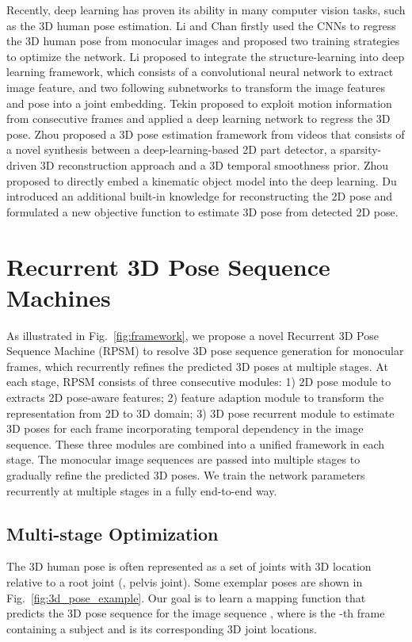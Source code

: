 \documentclass[10pt,twocolumn,letterpaper]{article}
\begin{document}
Recently, deep learning has proven its ability in many computer vision tasks, such as the 3D human pose estimation. Li and Chan \cite{li20143d} firstly used the CNNs to regress the 3D human pose from monocular images and proposed two training strategies to optimize the network. Li \etal \cite{li2015maximum} proposed to integrate the structure-learning into deep learning framework, which consists of a convolutional neural network to extract image feature, and two following subnetworks to transform the image features and pose into a joint embedding. Tekin \etal \cite{Tekin_2016_CVPR} proposed to exploit motion information from consecutive frames and applied a deep learning network to regress the 3D pose. Zhou \etal \cite{zhou2015sparseness} proposed a 3D pose estimation framework from videos that consists of a novel synthesis between a deep-learning-based 2D part detector, a sparsity-driven 3D reconstruction approach and a 3D temporal smoothness prior. Zhou \etal \cite{zhou2016deep} proposed to directly embed a kinematic object model into the deep learning. Du \etal \cite{DBLP:conf/eccv/DuWLHGWKG16} introduced an additional built-in knowledge for reconstructing the 2D pose and formulated a new objective function to estimate 3D pose from detected 2D pose.



\section{Recurrent 3D Pose Sequence Machines}
As illustrated in Fig.~\ref{fig:framework}, we propose a novel Recurrent 3D Pose Sequence Machine (RPSM) to resolve 3D pose sequence generation for monocular frames, which recurrently refines the predicted 3D poses at multiple stages. At each stage, RPSM consists of three consecutive modules: 1) 2D pose module to extracts 2D pose-aware features; 2) feature adaption module to transform the representation from 2D to 3D domain; 3) 3D pose recurrent module to estimate 3D poses for each frame incorporating temporal dependency in the image sequence. These three modules are combined into a unified framework in each stage. The monocular image sequences are passed into multiple stages to gradually refine the predicted 3D poses. We train the network parameters recurrently at multiple stages in a fully end-to-end way.

\subsection{Multi-stage Optimization}
The 3D human pose is often represented as a set of  joints with 3D location relative to a root joint (\eg, pelvis joint). Some exemplar poses are shown in Fig.~\ref{fig:3d_pose_example}. Our goal is to learn a mapping function that predicts the 3D pose sequence  for the image sequence , where  is the -th frame containing a subject and  is its corresponding 3D joint locations. 
\end{document}
